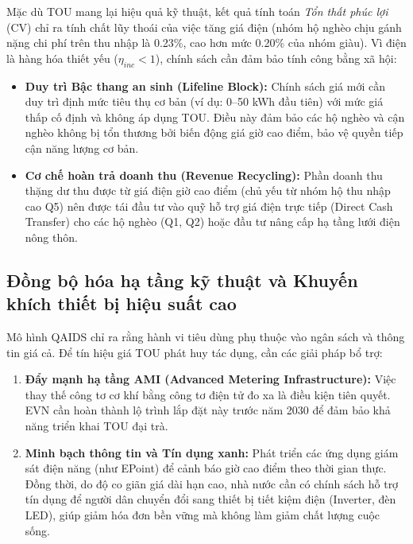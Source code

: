 \documentclass[12pt,a4paper,oneside]{article}
\begin{document}
Mặc dù TOU mang lại hiệu quả kỹ thuật, kết quả tính toán \textit{Tổn thất phúc lợi} (CV) chỉ ra tính chất lũy thoái của việc tăng giá điện (nhóm hộ nghèo chịu gánh nặng chi phí trên thu nhập là 0.23\%, cao hơn mức 0.20\% của nhóm giàu). Vì điện là hàng hóa thiết yếu ($\eta_{inc} < 1$), chính sách cần đảm bảo tính công bằng xã hội:

\begin{itemize}
	\item \textbf{Duy trì Bậc thang an sinh (Lifeline Block):} Chính sách giá mới cần duy trì định mức tiêu thụ cơ bản (ví dụ: 0--50 kWh đầu tiên) với mức giá thấp cố định và không áp dụng TOU. Điều này đảm bảo các hộ nghèo và cận nghèo không bị tổn thương bởi biến động giá giờ cao điểm, bảo vệ quyền tiếp cận năng lượng cơ bản.
	
	\item \textbf{Cơ chế hoàn trả doanh thu (Revenue Recycling):} Phần doanh thu thặng dư thu được từ giá điện giờ cao điểm (chủ yếu từ nhóm hộ thu nhập cao Q5) nên được tái đầu tư vào quỹ hỗ trợ giá điện trực tiếp (Direct Cash Transfer) cho các hộ nghèo (Q1, Q2) hoặc đầu tư nâng cấp hạ tầng lưới điện nông thôn.
\end{itemize}

\subsection{Đồng bộ hóa hạ tầng kỹ thuật và Khuyến khích thiết bị hiệu suất cao}

Mô hình QAIDS chỉ ra rằng hành vi tiêu dùng phụ thuộc vào ngân sách và thông tin giá cả. Để tín hiệu giá TOU phát huy tác dụng, cần các giải pháp bổ trợ:

\begin{enumerate}
	\item \textbf{Đẩy mạnh hạ tầng AMI (Advanced Metering Infrastructure):} Việc thay thế công tơ cơ khí bằng công tơ điện tử đo xa là điều kiện tiên quyết. EVN cần hoàn thành lộ trình lắp đặt này trước năm 2030 để đảm bảo khả năng triển khai TOU đại trà.
	\item \textbf{Minh bạch thông tin và Tín dụng xanh:} Phát triển các ứng dụng giám sát điện năng (như EPoint) để cảnh báo giờ cao điểm theo thời gian thực. Đồng thời, do độ co giãn giá dài hạn cao, nhà nước cần có chính sách hỗ trợ tín dụng để người dân chuyển đổi sang thiết bị tiết kiệm điện (Inverter, đèn LED), giúp giảm hóa đơn bền vững mà không làm giảm chất lượng cuộc sống.
\end{enumerate}
\end{document}
